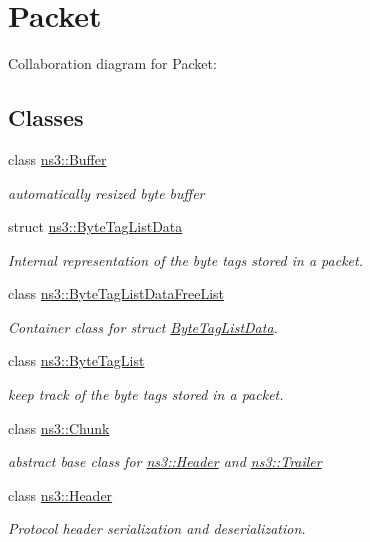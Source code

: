 \hypertarget{group__packet}{}\section{Packet}
\label{group__packet}
Collaboration diagram for Packet\+:
\subsection*{Classes}
\begin{DoxyCompactItemize}
\item 
class \hyperlink{classns3_1_1Buffer}{ns3\+::\+Buffer}
\begin{DoxyCompactList}\small\item\em automatically resized byte buffer \end{DoxyCompactList}\item 
struct \hyperlink{structns3_1_1ByteTagListData}{ns3\+::\+Byte\+Tag\+List\+Data}
\begin{DoxyCompactList}\small\item\em Internal representation of the byte tags stored in a packet. \end{DoxyCompactList}\item 
class \hyperlink{classns3_1_1ByteTagListDataFreeList}{ns3\+::\+Byte\+Tag\+List\+Data\+Free\+List}
\begin{DoxyCompactList}\small\item\em Container class for struct \hyperlink{structns3_1_1ByteTagListData}{Byte\+Tag\+List\+Data}. \end{DoxyCompactList}\item 
class \hyperlink{classns3_1_1ByteTagList}{ns3\+::\+Byte\+Tag\+List}
\begin{DoxyCompactList}\small\item\em keep track of the byte tags stored in a packet. \end{DoxyCompactList}\item 
class \hyperlink{classns3_1_1Chunk}{ns3\+::\+Chunk}
\begin{DoxyCompactList}\small\item\em abstract base class for \hyperlink{classns3_1_1Header}{ns3\+::\+Header} and \hyperlink{classns3_1_1Trailer}{ns3\+::\+Trailer} \end{DoxyCompactList}\item 
class \hyperlink{classns3_1_1Header}{ns3\+::\+Header}
\begin{DoxyCompactList}\small\item\em Protocol header serialization and deserialization. \end{DoxyCompactList}\item 

\end{DoxyCompactItemize}
